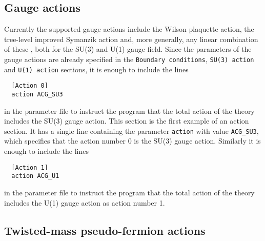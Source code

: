 \documentclass[11pt,fleqn]{article}
\begin{document}
\subsection{Gauge actions}
\label{subsec:actions:gauge}


Currently the supported gauge actions include the Wilson plaquette action, the
tree-level improved Symanzik action and, more generally, any linear combination
of these \cite{gauge_action}, both for the SU(3) and U(1) gauge field. Since the
parameters of the gauge actions are already specified in the \texttt{Boundary
conditions}, \texttt{SU(3) action} and \texttt{U(1) action} sections, it is
enough to include the lines
%
\begin{verbatim}
  [Action 0]
  action ACG_SU3
\end{verbatim}
%
in the parameter file to instruct the program that the total action of the
theory includes the SU(3) gauge action. This section is the first example of an
action section. It has a single line containing the parameter \texttt{action}
with value \texttt{ACG\_SU3}, which specifies that the action number 0 is the
SU(3) gauge action. Similarly it is enough to include the lines
%
\begin{verbatim}
  [Action 1]
  action ACG_U1
\end{verbatim}
%
in the parameter file to instruct the program that the total action of the
theory includes the U(1) gauge action as action number 1.


\subsection{Twisted-mass pseudo-fermion actions}
\label{subsec:actions:tm}
\end{document}
